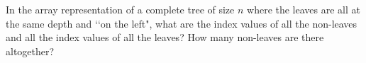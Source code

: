   In the array representation of a complete tree of size $n$ where
  the leaves are all at the same depth and \lq\lq on the left",
  what are the index values of all the non-leaves
  and all the index values of all the leaves?
  How many non-leaves are there altogether?
